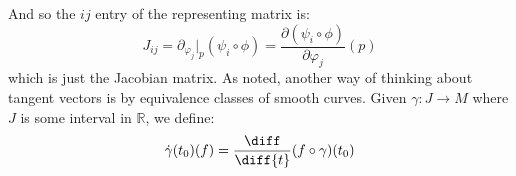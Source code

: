 \documentclass{book}                                                            %
\begin{document}
                And so the $ij$ entry of the representing matrix is:
                \begin{equation}
                    J_{ij}=\partial_{\varphi_{j}}|_{p}(\psi_{i}\circ\phi)
                    =\frac{\partial(\psi_{i}\circ\phi)}{\partial\varphi_{j}}(p)
                \end{equation}
                which is just the Jacobian matrix. As noted, another way of
                thinking about tangent vectors is by equivalence classes of
                smooth curves. Given $\gamma:J\rightarrow{M}$ where $J$ is some
                interval in $\mathbb{R}$, we define:
                \begin{equation}
                    \dot{\gamma}(t_{0})(f)
                        =\frac{\diff}{\diff{t}}(f\circ\gamma)(t_{0})
                \end{equation}
\end{document}
